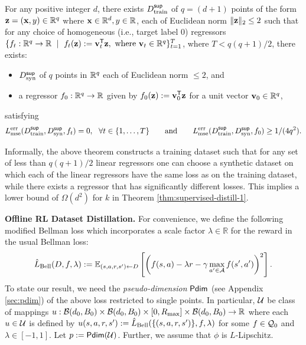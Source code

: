 \begin{theorem}\label{thm:lbnumber}
For any positive integer $d$, there exists $D^{\sf sup}_{\textnormal{train}}$ of  $q = (d+1)$ points of the form ${\mathbf{z}} = ({\mathbf{x}}, y) \in \mathbb{R}^q$ where ${\mathbf{x}} \in \mathbb{R}^d, y \in \mathbb{R}$, each of Euclidean norm $\|{\mathbf{z}}\|_2 \leq 2$ such that for any choice of homogeneous (i.e., target label $0$) regressors $\{f_t : \R^q \to \R\ \mid\ f_t(\bz) := \bv_t^{\sf T}\bz,  \tn{ where } \bv_t \in \R^q\}_{t=1}^T$,
where $T < q(q+1)/2$, there exists:
\begin{itemize}[noitemsep,nolistsep]
\item $D^{\sf sup}_{\textnormal{syn}}$ of  $q$ points in $\mathbb{R}^q$ each of Euclidean norm $\leq 2$, and 
\item a regressor $f_0 :\mathbb{R}^q \to \mathbb{R}$ given by $f_0({\mathbf{z}}) := {\mathbf{v}}_0^{\sf T}{\mathbf{z}}$ for a unit vector ${\mathbf{v}}_0 \in \mathbb{R}^q$,
\end{itemize}
satisfying
\begin{equation}\label{eqn:thm:lbnumber}
    L^{\tn{err}}_{\tn{mse}}(D^{\sf sup}_{\tn{train}}, D^{\sf sup}_{\tn{syn}}, f_t) = 0,\ \forall t \in \{1,\dots, T\} \quad \quad \tn{and} \quad \quad L^{\tn{err}}_{\tn{mse}}(D^{\sf sup}_{\tn{train}}, D^{\sf sup}_{\tn{syn}}, f_0) \geq 1/(4q^2).
\end{equation}
 \end{theorem}
 Informally, the above theorem constructs a training dataset such that for any set of less than $q(q+1)/2$ linear regressors one can choose a synthetic dataset on which each of the linear regressors have the same loss as on the training dataset, while there exists a regressor that has significantly different losses. This implies a lower bound of $\Omega(d^2)$ for $k$ in Theorem \ref{thm:supervised-distill-1}.


{\bf Offline RL Dataset Distillation.} For convenience, we define the following modified Bellman loss which incorporates a scale factor $\lambda \in \mathbb{R}$ for the reward in the usual Bellman loss:
\begin{equation}
    \hat{L}_{\textnormal{Bell}}(D, f, \lambda) := \mathbb{E}_{(s, a, r, s') \leftarrow D}\left[\left(f(s, a) - \lambda r - \gamma \max_{a' \in \mathcal{A}} f(s',a')\right)^2\right]. \label{eqn:hatLbell}
\end{equation}
To state our result, we need the \emph{pseudo-dimension} ${\sf Pdim}$ (see Appendix \ref{sec:pdim}) of the above loss restricted to single points. In particular, $\mathcal{U}$ be class of mappings $u: \mathcal{B}(d_0, B_0)\times \mathcal{B}(d_0, B_0) \times [0, R_{\textnormal{max}}]\times \mathcal{B}(d_0, B_0) \to \mathbb{R}$ where each $u \in \mathcal{U}$ is defined by $u(s, a, r, s') := \hat{L}_{\textnormal{Bell}}(\{(s, a, r, s')\}, f, \lambda)$ for some $f \in \mathcal{Q}_0$ and $\lambda\in [-1,1]$. Let $p := {\sf Pdim}(\mathcal{U})$. Further, we assume that $\phi$ is $L$-Lipschitz. \\

